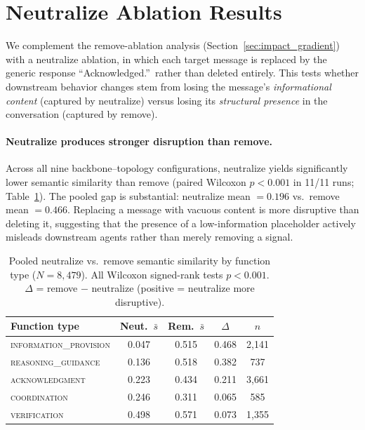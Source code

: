 \section{Neutralize Ablation Results}
\label{app:neutralize-detail}

We complement the remove-ablation analysis (Section~\ref{sec:impact_gradient}) with a neutralize ablation, in which each target message is replaced by the generic response ``Acknowledged.''\ rather than deleted entirely.  This tests whether downstream behavior changes stem from losing the message's \emph{informational content} (captured by neutralize) versus losing its \emph{structural presence} in the conversation (captured by remove).

\paragraph{Neutralize produces stronger disruption than remove.}
Across all nine backbone--topology configurations, neutralize yields significantly lower semantic similarity than remove (paired Wilcoxon $p < 0.001$ in 11/11 runs; Table~\ref{tab:neut_vs_rm}).  The pooled gap is substantial: neutralize mean $= 0.196$ vs.\ remove mean $= 0.466$.  Replacing a message with vacuous content is more disruptive than deleting it, suggesting that the presence of a low-information placeholder actively misleads downstream agents rather than merely removing a signal.

\begin{table}[t]
\centering
\caption{Pooled neutralize vs.\ remove semantic similarity by function type ($N = 8{,}479$). All Wilcoxon signed-rank tests $p < 0.001$. $\Delta$ = remove $-$ neutralize (positive = neutralize more disruptive).}
\label{tab:neut_vs_rm}
\small
\begin{tabular}{lcccc}
\toprule
\textbf{Function type} & \textbf{Neut.\ $\bar{s}$} & \textbf{Rem.\ $\bar{s}$} & \textbf{$\Delta$} & $n$ \\
\midrule
\textsc{information\_provision} & 0.047 & 0.515 & 0.468 & 2{,}141 \\
\textsc{reasoning\_guidance}    & 0.136 & 0.518 & 0.382 & 737 \\
\textsc{acknowledgment}         & 0.223 & 0.434 & 0.211 & 3{,}661 \\
\textsc{coordination}           & 0.246 & 0.311 & 0.065 & 585 \\
\textsc{verification}           & 0.498 & 0.571 & 0.073 & 1{,}355 \\
\bottomrule
\end{tabular}
\end{table}

